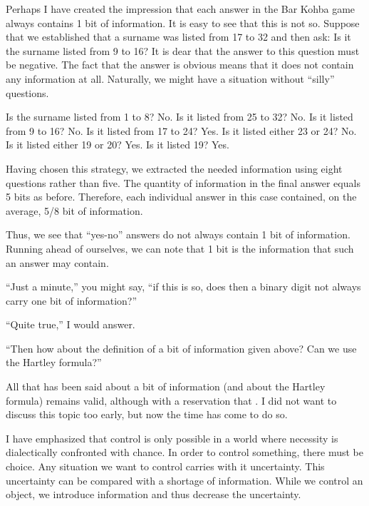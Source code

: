 Perhaps I have created the impression that each answer in the Bar
Kohba game always contains 1 bit of information. It is easy to see that
this is not so. Suppose that we established that a surname was listed
from 17 to 32 and then ask: Is it the surname listed from 9 to 16? It is
dear that the answer to this question must be negative. The fact that the
answer is obvious means that it does not contain any information at all.
Naturally, we might have a situation without ``silly'' questions.
\begin{dialogue}
\ques Is the surname listed from 1 to 8?
\ans No.
\ques Is it listed from 25 to 32?
\ans No.
\ques Is it listed from 9 to 16?
\ans No.
\ques Is it listed from 17 to 24?
\ans Yes.
\ques Is it listed either 23 or 24?
\ans No.
\ques Is it listed either 19 or 20?
\ans Yes.
\ques Is it listed 19?
\ans Yes.
\end{dialogue}
Having chosen this strategy, we extracted the needed information
using eight questions rather than five. The quantity of information in the
final answer equals 5 bits as before. Therefore, each individual answer in
this case contained, on the average, 5/8 bit of information.

Thus, we see that ``yes-no'' answers do not always contain 1 bit of
information. Running ahead of ourselves, we can note that 1 bit is the
 information that such an answer may contain.

``Just a minute,'' you might say, ``if this is so, does then a binary digit
not always carry one bit of information?''

``Quite true,'' I would answer.

``Then how about the definition of a bit of information given above?
Can we use the Hartley formula?''

All that has been said about a bit of information (and about the
Hartley formula) remains valid, although with a reservation that . I did not want to discuss this topic too
early, but now the time has come to do so.

 I have
emphasized that control is only possible in a world where necessity is
dialectically confronted with chance. In order to control something,
there must be choice. Any situation we want to control carries with it
uncertainty. This uncertainty can be compared with a shortage of
information. While we control an object, we introduce information and
thus decrease the uncertainty.

